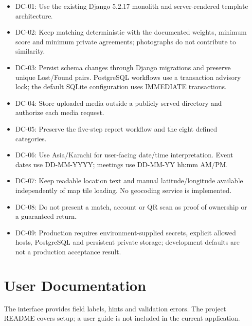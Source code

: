 \documentclass[12pt,a4paper,oneside]{report}
\begin{document}
\begin{itemize}

\item DC-01: Use the existing Django 5.2.17 monolith and server-rendered template architecture.

\item DC-02: Keep matching deterministic with the documented weights, minimum score and minimum private agreements; photographs do not contribute to similarity.

\item DC-03: Persist schema changes through Django migrations and preserve unique Lost/Found pairs. PostgreSQL workflows use a transaction advisory lock; the default SQLite configuration uses IMMEDIATE transactions.

\item DC-04: Store uploaded media outside a publicly served directory and authorize each media request.

\item DC-05: Preserve the five-step report workflow and the eight defined categories.

\item DC-06: Use Asia/Karachi for user-facing date/time interpretation. Event dates use DD-MM-YYYY; meetings use DD-MM-YY hh:mm AM/PM.

\item DC-07: Keep readable location text and manual latitude/longitude available independently of map tile loading. No geocoding service is implemented.

\item DC-08: Do not present a match, account or QR scan as proof of ownership or a guaranteed return.

\item DC-09: Production requires environment-supplied secrets, explicit allowed hosts, PostgreSQL and persistent private storage; development defaults are not a production acceptance result.

\end{itemize}


\section{User Documentation}

The interface provides field labels, hints and validation errors. The project README covers setup; a user guide is not included in the current application.
\end{document}
